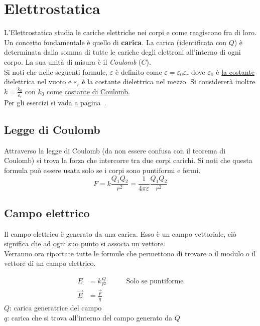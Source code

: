
\section{Elettrostatica}\label{sec:elettrostatica}
L'Elettrostatica studia le cariche elettriche nei corpi e come reagiscono fra di loro.\\
Un concetto fondamentale è quello di \textbf{carica}. La carica (identificata con $Q$) è determinata 
dalla somma di tutte le cariche degli elettroni all'interno di ogni corpo. La sua unità di misura è il 
\emph{Coulomb} ($C$).\\[\baselineskip]
Si noti che nelle seguenti formule, $\varepsilon$ è definito come 
$\varepsilon = \varepsilon_0\varepsilon_r$ dove $\varepsilon_0$ è \hyperref[tab:e0]{la costante
dielettrica nel vuoto} e $\varepsilon_r$ è la costante dielettrica nel mezzo. Si considererà 
inoltre $k = \frac{k_0}{\varepsilon_r}$ con $k_0$ come \hyperref[tab:k0]{costante di Coulomb}.\\
Per gli esercizi si vada a pagina~\pageref{ex:elettrostatica}.

\subsection{Legge di Coulomb}
Attraverso la legge di Coulomb (da non essere confusa con il teorema di Coulomb) si trova la forza che 
intercorre tra due corpi carichi. Si noti che questa formula può essere usata solo se i corpi sono 
puntiformi e fermi.
\begin{equation*}
  F = k\frac{Q_1Q_2}{r^2} = \frac{1}{4\pi\varepsilon}\frac{Q_1Q_2}{r^2}
\end{equation*}

\subsection{Campo elettrico}
Il campo elettrico è generato da una carica. Esso è un campo vettoriale, ciò significa che ad ogni
suo punto si associa un vettore.\\ 
Verranno ora riportate tutte le formule che permettono di trovare o il modulo o il vettore di un
campo elettrico.

\begin{align*}
  E &= k\frac{Q}{r^2} &\qquad\text{Solo se puntiforme}\\
  \vec{E} &= \frac{\vec{F}}{q} &
\end{align*}
$Q$: carica generatrice del campo\\
$q$: carica che si trova all'interno del campo generato da $Q$


